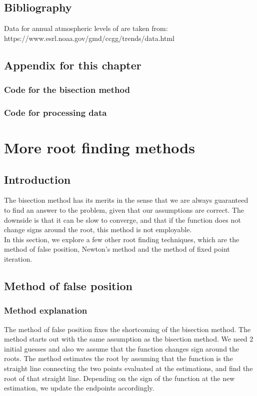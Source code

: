 \documentclass[openany]{book}
\begin{document}
	\section{Bibliography}
	Data for annual atmospheric levels of  are taken from: \\
	https://www.esrl.noaa.gov/gmd/ccgg/trends/data.html
	\section{Appendix for this chapter}
	\subsection{Code for the bisection method}
	
	\subsection{Code for processing data}
	
	\chapter{More root finding methods}
    \section{Introduction}
    The bisection method has its merits in the sense that we are always guaranteed to find an answer to the problem, given that our assumptions are correct. The downside is that it can be slow to converge, and that if the function does not change signs around the root, this method is not employable.\\
    In this section, we explore a few other root finding techniques, which are the method of false position, Newton's method and the method of fixed point iteration.
    \section{Method of false position}
    \subsection{Method explanation}
    The method of false position fixes the shortcoming of the bisection method. The method starts out with the same assumption as the bisection method. We need 2 initial guesses and also we assume that the function changes sign around the roots. The method estimates the root by assuming that the function is the straight line connecting the two points evaluated at the estimations, and find the root of that straight line. Depending on the sign of the function at the new estimation, we update the endpoints accordingly.
\end{document}
